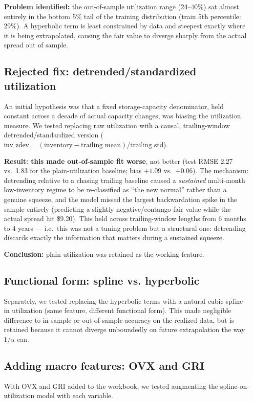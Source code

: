 \documentclass[11pt]{article}
\begin{document}
\textbf{Problem identified:} the out-of-sample utilization range (24--40\%)
sat almost entirely in the bottom 5\% tail of the training distribution
(train 5th percentile: 29\%). A hyperbolic term is least constrained by
data and steepest exactly where it is being extrapolated, causing the fair
value to diverge sharply from the actual spread out of sample.

\subsection{Rejected fix: detrended/standardized utilization}
An initial hypothesis was that a fixed storage-capacity denominator, held
constant across a decade of actual capacity changes, was biasing the
utilization measure. We tested replacing raw utilization with a causal,
trailing-window detrended/standardized version
($\text{inv\_zdev} = (\text{inventory} - \text{trailing mean}) /
\text{trailing std}$).

\textbf{Result: this made out-of-sample fit worse}, not better (test RMSE
2.27 vs.\ 1.83 for the plain-utilization baseline; bias $+1.09$ vs.\
$+0.06$). The mechanism: detrending relative to a chasing trailing baseline
caused a \emph{sustained} multi-month low-inventory regime to be
re-classified as ``the new normal'' rather than a genuine squeeze, and the
model missed the largest backwardation spike in the sample entirely
(predicting a slightly negative/contango fair value while the actual spread
hit \$9.20). This held across trailing-window lengths from 6 months to 4
years --- i.e.\ this was not a tuning problem but a structural one:
detrending discards exactly the information that matters during a
sustained squeeze.

\textbf{Conclusion:} plain utilization was retained as the working feature.

\subsection{Functional form: spline vs. hyperbolic}
Separately, we tested replacing the hyperbolic terms with a natural cubic
spline in utilization (same feature, different functional form). This made
negligible difference to in-sample or out-of-sample accuracy on the
realized data, but is retained because it cannot diverge unboundedly on
future extrapolation the way $1/u$ can.

\subsection{Adding macro features: OVX and GRI}
With OVX and GRI added to the workbook, we tested augmenting the
spline-on-utilization model with each variable.
\end{document}
